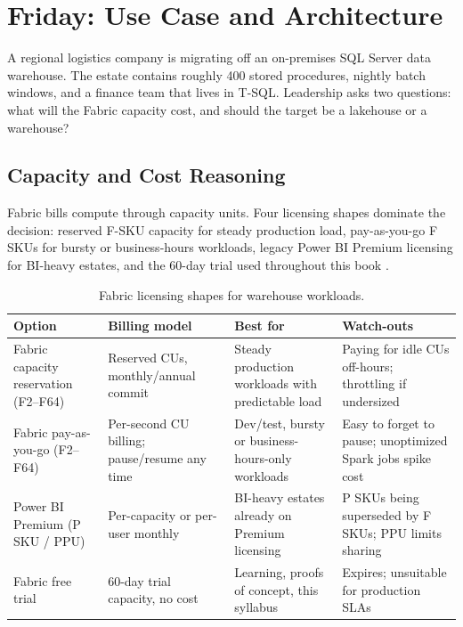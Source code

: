 \section{Friday: Use Case and Architecture}
A regional logistics company is migrating off an on-premises SQL Server data warehouse. The estate contains roughly 400 stored procedures, nightly batch windows, and a finance team that lives in T-SQL. Leadership asks two questions: what will the Fabric capacity cost, and should the target be a lakehouse or a warehouse?

\subsection{Capacity and Cost Reasoning}
Fabric bills compute through capacity units. Four licensing shapes dominate the decision: reserved F-SKU capacity for steady production load, pay-as-you-go F SKUs for bursty or business-hours workloads, legacy Power BI Premium licensing for BI-heavy estates, and the 60-day trial used throughout this book \cite{microsoftFabricCapacity,microsoftFabricTrial}.

\begin{table}[H]
\centering
\small
\begin{tabular}{@{}p{3.6cm}p{3.2cm}p{3.8cm}p{4.4cm}@{}}
\toprule
\textbf{Option} & \textbf{Billing model} & \textbf{Best for} & \textbf{Watch-outs} \\
\midrule
Fabric capacity reservation (F2--F64) & Reserved CUs, monthly/annual commit & Steady production workloads with predictable load & Paying for idle CUs off-hours; throttling if undersized \\
Fabric pay-as-you-go (F2--F64) & Per-second CU billing; pause/resume any time & Dev/test, bursty or business-hours-only workloads & Easy to forget to pause; unoptimized Spark jobs spike cost \\
Power BI Premium (P SKU / PPU) & Per-capacity or per-user monthly & BI-heavy estates already on Premium licensing & P SKUs being superseded by F SKUs; PPU limits sharing \\
Fabric free trial & 60-day trial capacity, no cost & Learning, proofs of concept, this syllabus & Expires; unsuitable for production SLAs \\
\bottomrule
\end{tabular}
\caption{Fabric licensing shapes for warehouse workloads.}
\label{tab:chapter5-licensing}
\end{table}


